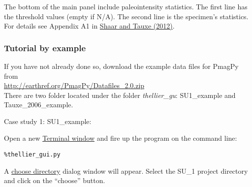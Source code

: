 \documentclass[11pt]{book}
\begin{document}
{{The bottom of the main panel include paleointensity statistics. The first line has  the threshold values (empty if N/A). The second line is the specimen's statistics. For details see Appendix A1 in \href{http://magician.ucsd.edu/~ltauxe/CV/open/shaar12.pdf}{Shaar and Tauxe (2012)}. \nocite{shaar12}


\subsubsection{ Tutorial by example}
 If you have not already done so, download  the example data files for PmagPy from\\  \url{http://earthref.org/PmagPy/Datafiles_2.0.zip}\\ 
 There are two folder located under the folder  {\it thellier\_gu}: SU1\_example and Tauxe\_2006\_example.


{Case study 1: SU1\_example:}

Open a new \href{#command_line}{Terminal window} and fire up the program on the command line:
\begin{verbatim}
%thellier_gui.py
\end{verbatim}
A \href{#choose_directory} {choose directory} dialog window will appear. Select the SU\_1 project directory and click on the ``choose'' button.

}}
\end{document}
